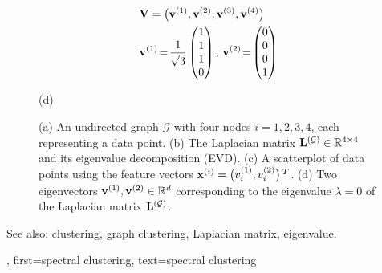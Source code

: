 {{{\begin{figure}[H]
\begin{center}
\begin{minipage}{0.4\textwidth}
				\end{minipage} 
    				\begin{minipage}{0.4\textwidth}
					\begin{align}
					& \mathbf{V} = \big( {\bf v}^{(1)},{\bf v}^{(2)},{\bf v}^{(3)},{\bf v}^{(4)} \big) \nonumber \\
					&	\mathbf{v}^{(1)}\!=\!\frac{1}{\sqrt{3}} \begin{pmatrix} 1 \\ 1 \\ 1 \\ 0 \end{pmatrix}, \,
					\mathbf{v}^{(2)}\!=\!\begin{pmatrix} 0 \\ 0 \\ 0 \\ 1 \end{pmatrix} \nonumber 
					\end{align}
					\begin{minipage}{\textwidth}
						\vspace{3ex}
						\centering
						{\selectfont (d)}
					\end{minipage}
				\end{minipage} 
				\caption{\label{fig_lap_mtx_specclustering_dict} (a) An undirected graph 
					$\mathcal{G}$ with four nodes $i=1,2,3,4$, each representing a data point. (b) The Laplacian matrix 
					${\bf L}^{(\mathcal{G})} \in \mathbb{R}^{4 \times 4}$ and its eigenvalue decomposition (EVD). 
					(c) A scatterplot of data points using the feature vectors 
					${\bf x}^{(i)} = \big( v^{(1)}_{i},v^{(2)}_{i} \big)\,^{T}$. 
					(d) Two eigenvectors ${\bf v}^{(1)},{\bf v}^{(2)} \in \mathbb{R}^{d}$ 
					corresponding to the eigenvalue $\lambda=0$ of the Laplacian matrix ${\bf L}^{(\mathcal{G})}$. } 
			\end{center}
		\end{figure}
		See also: clustering, graph clustering, Laplacian matrix, eigenvalue.
	\newpage}, 
	first={spectral clustering},
	text={spectral clustering} 
}

}
